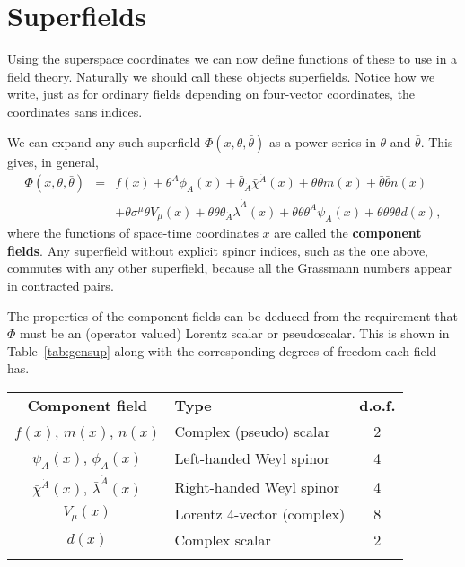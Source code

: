\documentclass[notes.tex]{subfiles}
\begin{document}
\section{Superfields}
Using the superspace coordinates we can now define functions of these to use in a field theory. Naturally we should call these objects superfields.
Notice how we write, just as for ordinary fields depending on four-vector coordinates, the coordinates sans indices. 

We can expand any such superfield $\Phi(x, \theta, \bar{\theta})$  as a power series in $\theta$ and $\bar{\theta}$. This gives, in general,
\begin{eqnarray}
\Phi(x, \theta, \bar{\theta}) &=& f(x) + \theta^A\phi_A(x) + \bar{\theta}_{\dot{A}}\bar{\chi}^{\dot{A}}(x) + \theta\theta m(x) + \bar{\theta}\bar{\theta}n(x) \nonumber\\ 
&& + \theta \sigma^\mu \bar{\theta}V_\mu(x) + \theta \theta \bar{\theta}_{\dot{A}}\bar{\lambda}^{\dot{A}}(x) +\bar{\theta}\bar{\theta}\theta^A\psi_A(x) + \theta\theta\bar{\theta}\bar{\theta}d(x),\label{eq:gen_sup}
\end{eqnarray} 
where the functions of space-time coordinates $x$ are called the {\bf component fields}. Any superfield without explicit spinor indices, such as the one above, commutes with any other superfield, because all the Grassmann numbers appear in contracted pairs. 

The properties of the component fields can be deduced from the requirement that $\Phi$ must be an (operator valued) Lorentz scalar or pseudoscalar. This is shown in Table~\ref{tab:gensup} along with the corresponding degrees of freedom each field has.
\begin{center}
   \begin{tabular}{c |l| c} 
   \noalign{\smallskip}\hline\noalign{\smallskip}
   {\bf Component field} & {\bf Type} & {\bf d.o.f.} \\
   \noalign{\smallskip}\hline\noalign{\smallskip}
   $f(x)$, $m(x)$, $n(x)$ & Complex (pseudo) scalar & 2\\
   $\psi_A(x)$, $\phi_A(x)$ & Left-handed Weyl spinor & 4\\
   $\bar{\chi}^{\dot{A}}(x)$, $\bar{\lambda}^{\dot{A}}(x)$ &Right-handed Weyl spinor& 4\\
   $V_\mu(x)$ & Lorentz 4-vector (complex) & 8\\
   $d(x)$ & Complex scalar & 2 \\
   \noalign{\smallskip}\hline\noalign{\smallskip}
    \end{tabular}
   \end{center}
\end{document}
